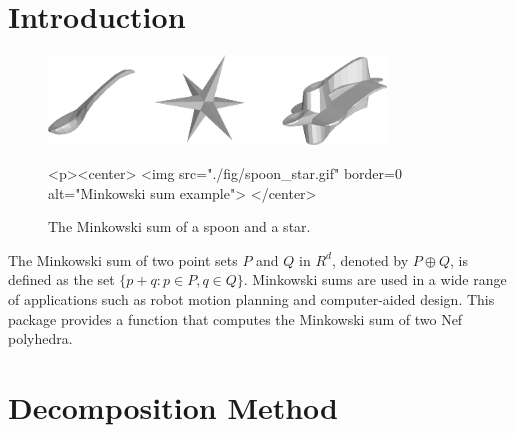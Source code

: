
\ccParDims


%

\section{Introduction}

\begin{figure}
  \begin{ccTexOnly}
    \begin{center}
      \includegraphics[width=0.8\textwidth]{Minkowski_sum_3/fig/spoon_star}
    \end{center}
  \end{ccTexOnly}
  \begin{ccHtmlOnly}
    <p><center>
    <img src="./fig/spoon_star.gif" border=0 alt="Minkowski sum example">
    </center>
  \end{ccHtmlOnly}
  \caption{The Minkowski sum of a spoon and a star.}
\end{figure}

The Minkowski sum of two point sets $P$ and $Q$ in $R^d$, denoted by
$P \oplus Q$, is defined as the set $\{p+q:p \in P, q \in Q
\}$. Minkowski sums are used in a wide range of applications such as
robot motion planning and computer-aided design. This
package provides a function that computes the Minkowski sum of two Nef
polyhedra.

\section{Decomposition Method}

